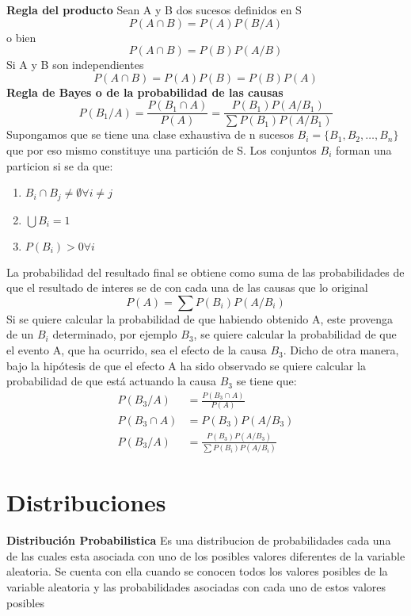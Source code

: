 \documentclass[10pt,a4paper]{article}
\begin{document}
\textbf{Regla del producto} Sean A y B dos sucesos definidos en S
\begin{equation}
	P(A\cap B)=P(A)P(B/A)
\end{equation}
o bien
\begin{equation}
	P(A\cap B)=P(B)P(A/B)
\end{equation}
Si A y B son independientes
\begin{equation}
	P(A\cap B)=P(A)P(B)=P(B)P(A)
\end{equation}
\textbf{Regla de Bayes o de la probabilidad de las causas}
\begin{equation}
	P(B_1/A)=\frac{P(B_1\cap A)}{P(A)}=\frac{P(B_1)P(A/B_1)}{\sum P(B_1)P(A/B_1)}
\end{equation}
Supongamos que se tiene una clase exhaustiva de n sucesos $B_i=\{B_1,B_2,\dots,B_n\}$ que por eso mismo constituye una partición de S.
Los conjuntos $B_i$ forman una particion si se da que:
\begin{enumerate}
	\item $B_i \cap B_j \neq \emptyset \forall i \neq j$
	\item $\bigcup B_i = 1$
	\item $P(B_i)>0 \forall i$
\end{enumerate}
La probabilidad del resultado final se obtiene como suma de las probabilidades de que el resultado de interes se de con cada una de las causas que lo original
\begin{equation}
	P(A)=\sum P(B_i)P(A/B_i)
\end{equation}
Si se quiere calcular la probabilidad de que habiendo obtenido A, este provenga de un $B_i$ determinado, por ejemplo $B_3$, se quiere calcular la probabilidad de que el evento A, que ha ocurrido, sea el efecto de la causa $B_3$. Dicho de otra manera, bajo la hipótesis de que el efecto A ha sido observado se quiere calcular la probabilidad de que está actuando la causa $B_3$ se tiene que:
\begin{align}
	P(B_3/A)&=\frac{P(B_3\cap A)}{P(A)}\\
	P(B_3\cap A)&=P(B_3)P(A/B_3)\\
	P(B_3/A)&= \frac{P(B_3)P(A/B_3)}{\sum P(B_i)P(A/B_i)}
\end{align}
\section{Distribuciones}
\textbf{Distribución Probabilistica} Es una distribucion de probabilidades cada una de las cuales esta asociada con uno de los posibles valores diferentes de la variable aleatoria. Se cuenta con ella cuando se conocen todos los valores posibles de la variable aleatoria y las probabilidades asociadas con cada uno de estos valores posibles\\
\end{document}
